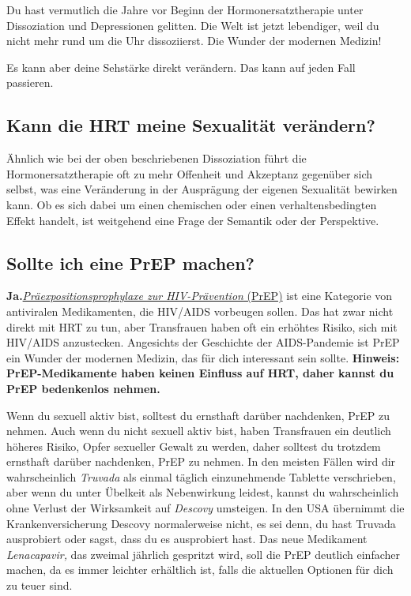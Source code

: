 \documentclass{article}
\begin{document}
Du hast vermutlich die Jahre vor Beginn der Hormonersatztherapie unter Dissoziation und Depressionen gelitten. Die Welt ist jetzt lebendiger, weil du nicht mehr rund um die Uhr dissoziierst. Die Wunder der modernen Medizin!

Es kann aber deine Sehstärke direkt verändern. Das kann auf jeden Fall passieren.

\subsection{Kann die HRT meine Sexualität verändern?}

Ähnlich wie bei der oben beschriebenen Dissoziation führt die Hormonersatztherapie oft zu mehr Offenheit und Akzeptanz gegenüber sich selbst, was eine Veränderung in der Ausprägung der eigenen Sexualität bewirken kann. Ob es sich dabei um einen chemischen oder einen verhaltensbedingten Effekt handelt, ist weitgehend eine Frage der Semantik oder der Perspektive.

\subsection{Sollte ich eine PrEP machen?}\label{11-25}

\textbf{Ja.}\href{https://de.wikipedia.org/wiki/Pr%C3%A4expositionsprophylaxe}{\textit{Präexpositionsprophylaxe zur HIV-Prävention} (PrEP)} ist eine Kategorie von antiviralen Medikamenten, die HIV/AIDS vorbeugen sollen. Das hat zwar nicht direkt mit HRT zu tun, aber Transfrauen haben oft ein erhöhtes Risiko, sich mit HIV/AIDS anzustecken. Angesichts der Geschichte der AIDS-Pandemie ist PrEP ein Wunder der modernen Medizin, das für dich interessant sein sollte. \textbf{Hinweis: PrEP-Medikamente haben keinen Einfluss auf HRT, daher kannst du PrEP bedenkenlos nehmen.}


Wenn du sexuell aktiv bist, solltest du ernsthaft darüber nachdenken, PrEP zu nehmen. Auch wenn du nicht sexuell aktiv bist, haben Transfrauen ein deutlich höheres Risiko, Opfer sexueller Gewalt zu werden, daher solltest du trotzdem ernsthaft darüber nachdenken, PrEP zu nehmen. In den meisten Fällen wird dir wahrscheinlich \textit{Truvada} als einmal täglich einzunehmende Tablette verschrieben, aber wenn du unter Übelkeit als Nebenwirkung leidest, kannst du wahrscheinlich ohne Verlust der Wirksamkeit auf \textit{Descovy} umsteigen. In den USA übernimmt die Krankenversicherung Descovy normalerweise nicht, es sei denn, du hast Truvada ausprobiert oder sagst, dass du es ausprobiert hast. Das neue Medikament \textit{Lenacapavir,} das zweimal jährlich gespritzt wird, soll die PrEP deutlich einfacher machen, da es immer leichter erhältlich ist, falls die aktuellen Optionen für dich zu teuer sind.
\end{document}
